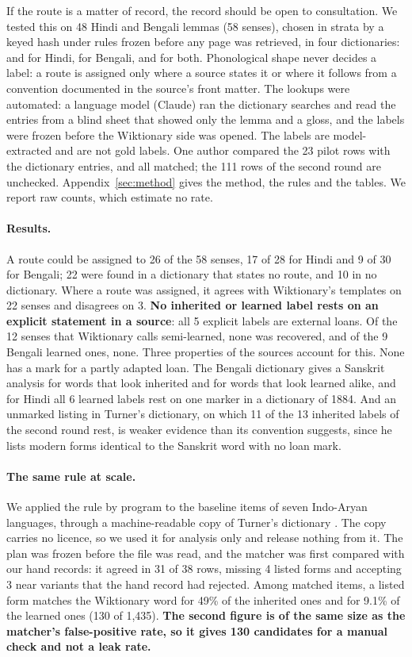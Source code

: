 \documentclass[11pt]{article}
\begin{document}
If the route is a matter of record, the record should be open to consultation. We tested this on 48 Hindi and Bengali lemmas (58 senses), chosen in strata by a keyed hash under rules frozen before any page was retrieved, in four dictionaries: \citet{platts1884} and \citet{dasa1975sabdasagara} for Hindi, \citet{dasa1937bangala} for Bengali, and \citet{turner1966cdial} for both. Phonological shape never decides a label: a route is assigned only where a source states it or where it follows from a convention documented in the source's front matter. The lookups were automated: a language model (Claude) ran the dictionary searches and read the entries from a blind sheet that showed only the lemma and a gloss, and the labels were frozen before the Wiktionary side was opened. The labels are model-extracted and are not gold labels. One author compared the 23 pilot rows with the dictionary entries, and all matched; the 111 rows of the second round are unchecked. Appendix~\ref{sec:method} gives the method, the rules and the tables. We report raw counts, which estimate no rate.

\paragraph{Results.} A route could be assigned to 26 of the 58 senses, 17 of 28 for Hindi and 9 of 30 for Bengali; 22 were found in a dictionary that states no route, and 10 in no dictionary. Where a route was assigned, it agrees with Wiktionary's templates on 22 senses and disagrees on 3. \textbf{No inherited or learned label rests on an explicit statement in a source}: all 5 explicit labels are external loans. Of the 12 senses that Wiktionary calls semi-learned, none was recovered, and of the 9 Bengali learned ones, none. Three properties of the sources account for this. None has a mark for a partly adapted loan. The Bengali dictionary gives a Sanskrit analysis for words that look inherited and for words that look learned alike, and for Hindi all 6 learned labels rest on one marker in a dictionary of 1884. And an unmarked listing in Turner's dictionary, on which 11 of the 13 inherited labels of the second round rest, is weaker evidence than its convention suggests, since he lists modern forms identical to the Sanskrit word with no loan mark.


\paragraph{The same rule at scale.} We applied the rule by program to the baseline items of seven Indo-Aryan languages, through a machine-readable copy of Turner's dictionary \citep{arora2023jambu}. The copy carries no licence, so we used it for analysis only and release nothing from it. The plan was frozen before the file was read, and the matcher was first compared with our hand records: it agreed in 31 of 38 rows, missing 4 listed forms and accepting 3 near variants that the hand record had rejected. Among matched items, a listed form matches the Wiktionary word for 49\% of the inherited ones and for 9.1\% of the learned ones (130 of 1,435). \textbf{The second figure is of the same size as the matcher's false-positive rate, so it gives 130 candidates for a manual check and not a leak rate.}
\end{document}
